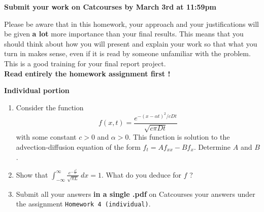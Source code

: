 \documentclass[11pt]{article}
\begin{document}
{\bf Submit your work on Catcourses by March 3rd at 11:59pm}

Please be aware that in this homework, your approach and your justifications will be given {\bf a lot} more importance than your final results. This means that you should think about how you will present and explain your work so that what you turn in makes sense, even if it is read by someone unfamiliar with the problem. This is a good training for your final report project.\\
\textbf{Read entirely the homework assignment first !}

\textbf{Individual portion}
\begin{enumerate}
\item Consider the function 
\[
f(x,t) = \frac{e^{-(x- \alpha t)^2/cDt}}{\sqrt{c \pi D t }}
\]
with some constant $c>0$ and $\alpha>0$. This function is solution to the advection-diffusion equation of the form $f_t = A f_{xx} - B f_x$. Determine $A$ and $B$.
\item Show that $ \displaystyle \int_{-\infty}^{\infty} \frac{e^{-\frac{x^2}{L}}}{\sqrt{ \pi L}} \ dx = 1$. What do you deduce for $f$ ?

\item Submit all your answers \textbf{in a single .pdf} on Catcourses your answers under the assignment \texttt{Homework 4 (individual)}. 
\end{enumerate}
\end{document}
